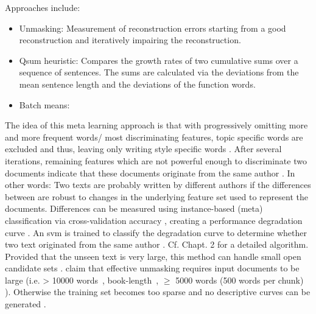 \begin{definition}
    Approaches include:
    \begin{itemize}
        \item Unmasking: Measurement of reconstruction errors starting from a good reconstruction and iteratively impairing the reconstruction. %
        \item Qsum heuristic: Compares the growth rates of two cumulative sums over a sequence of sentences. The sums are calculated via the deviations from the mean sentence length and the deviations of the function words.
        \item Batch means: 
    \end{itemize}
\end{definition}

\begin{definition}
    [Unmasking]
    The idea of this meta learning approach is that with progressively omitting more and more frequent words/ most discriminating features, 
    topic specific words are excluded and thus, leaving only writing style specific words \cite{stein_intrinsic_2011}.
    After several iterations, remaining features which are not powerful enough to discriminate two documents indicate that 
    these documents originate from the same author \cite{stein_intrinsic_2011,tyo_state_2022,bevendorff_divergence_based_2020}.
    In other words: 
    Two texts are probably written by different authors if the differences between are robust to changes in the underlying feature set used to represent the documents.
    Differences can be measured using instance-based (meta) classification via cross-validation accuracy \cite{koppel_authorship_2011,bevendorff_generalizing_2019,bevendorff_divergence_based_2020}, 
    creating a performance degradation curve \cite{tyo_state_2022}.
    An \ac{svm} is trained to classify the degradation curve to determine whether two text originated from the same author \cite{tyo_state_2022,bevendorff_generalizing_2019}.
    Cf. \cite{bevendorff_divergence_based_2020} Chapt. 2 for a detailed algorithm.
    Provided that the unseen text is very large, this method can handle small open candidate sets \cite{koppel_authorship_2011}.
    \citet{koppel_determining_2014,bevendorff_generalizing_2019} claim that effective unmasking requires input documents to be large 
    (i.e. > 10000 words~\cite{koppel_determining_2014}, book-length~\cite{bevendorff_generalizing_2019}, $\geq$ 5000 words (500 words per chunk) \cite{bevendorff_divergence_based_2020}).
    Otherwise the training set becomes too sparse and no descriptive curves can be generated \cite{bevendorff_generalizing_2019,bevendorff_divergence_based_2020}.
\end{definition}

